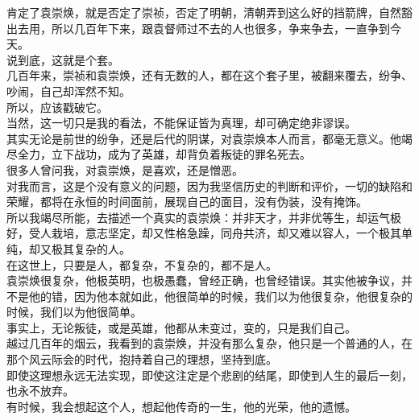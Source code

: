 \begin{multicols}{\theparacolNo}
肯定了袁崇焕，就是否定了崇祯，否定了明朝，清朝弄到这么好的挡箭牌，自然豁出去用，所以几百年下来，跟袁督师过不去的人也很多，争来争去，一直争到今天。\\

说到底，这就是个套。\\

几百年来，崇祯和袁崇焕，还有无数的人，都在这个套子里，被翻来覆去，纷争、吵闹，自己却浑然不知。\\

所以，应该戳破它。\\

当然，这一切只是我的看法，不能保证皆为真理，却可确定绝非谬误。\\

其实无论是前世的纷争，还是后代的阴谋，对袁崇焕本人而言，都毫无意义。他竭尽全力，立下战功，成为了英雄，却背负着叛徒的罪名死去。\\

很多人曾问我，对袁崇焕，是喜欢，还是憎恶。\\

对我而言，这是个没有意义的问题，因为我坚信历史的判断和评价，一切的缺陷和荣耀，都将在永恒的时间面前，展现自己的面目，没有伪装，没有掩饰。\\

所以我竭尽所能，去描述一个真实的袁崇焕：并非天才，并非优等生，却运气极好，受人栽培，意志坚定，却又性格急躁，同舟共济，却又难以容人，一个极其单纯，却又极其复杂的人。\\

在这世上，只要是人，都复杂，不复杂的，都不是人。\\

袁崇焕很复杂，他极英明，也极愚蠢，曾经正确，也曾经错误。其实他被争议，并不是他的错，因为他本就如此，他很简单的时候，我们以为他很复杂，他很复杂的时候，我们以为他很简单。\\

事实上，无论叛徒，或是英雄，他都从未变过，变的，只是我们自己。\\

越过几百年的烟云，我看到的袁崇焕，并没有那么复杂，他只是一个普通的人，在那个风云际会的时代，抱持着自己的理想，坚持到底。\\

即使这理想永远无法实现，即使这注定是个悲剧的结尾，即使到人生的最后一刻，也永不放弃。\\

有时候，我会想起这个人，想起他传奇的一生，他的光荣，他的遗憾。\\


\end{multicols}
